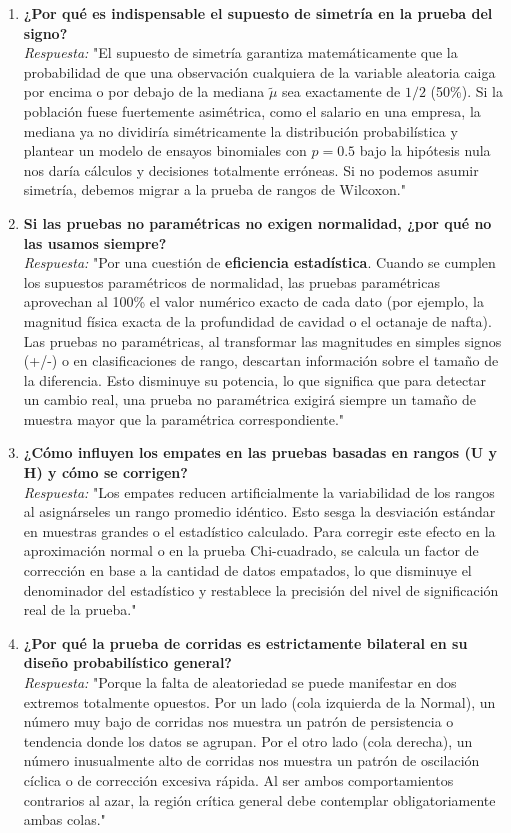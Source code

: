 \documentclass[11pt,a4paper]{article}
\begin{document}
\begin{enumerate}
    \item \textbf{¿Por qué es indispensable el supuesto de simetría en la prueba del signo?} \\
          \textit{Respuesta:} "El supuesto de simetría garantiza matemáticamente que la probabilidad de que una observación cualquiera de la variable aleatoria caiga por encima o por debajo de la mediana $\tilde{\mu}$ sea exactamente de $1/2$ (50\%). Si la población fuese fuertemente asimétrica, como el salario en una empresa, la mediana ya no dividiría simétricamente la distribución probabilística y plantear un modelo de ensayos binomiales con $p=0.5$ bajo la hipótesis nula nos daría cálculos y decisiones totalmente erróneas. Si no podemos asumir simetría, debemos migrar a la prueba de rangos de Wilcoxon."
    
    \item \textbf{Si las pruebas no paramétricas no exigen normalidad, ¿por qué no las usamos siempre?} \\
          \textit{Respuesta:} "Por una cuestión de \textbf{eficiencia estadística}. Cuando se cumplen los supuestos paramétricos de normalidad, las pruebas paramétricas aprovechan al 100\% el valor numérico exacto de cada dato (por ejemplo, la magnitud física exacta de la profundidad de cavidad o el octanaje de nafta). Las pruebas no paramétricas, al transformar las magnitudes en simples signos (+/-) o en clasificaciones de rango, descartan información sobre el tamaño de la diferencia. Esto disminuye su potencia, lo que significa que para detectar un cambio real, una prueba no paramétrica exigirá siempre un tamaño de muestra mayor que la paramétrica correspondiente."
          
    \item \textbf{¿Cómo influyen los empates en las pruebas basadas en rangos (U y H) y cómo se corrigen?} \\
          \textit{Respuesta:} "Los empates reducen artificialmente la variabilidad de los rangos al asignárseles un rango promedio idéntico. Esto sesga la desviación estándar en muestras grandes o el estadístico calculado. Para corregir este efecto en la aproximación normal o en la prueba Chi-cuadrado, se calcula un factor de corrección en base a la cantidad de datos empatados, lo que disminuye el denominador del estadístico y restablece la precisión del nivel de significación real de la prueba."

    \item \textbf{¿Por qué la prueba de corridas es estrictamente bilateral en su diseño probabilístico general?} \\
          \textit{Respuesta:} "Porque la falta de aleatoriedad se puede manifestar en dos extremos totalmente opuestos. Por un lado (cola izquierda de la Normal), un número muy bajo de corridas nos muestra un patrón de persistencia o tendencia donde los datos se agrupan. Por el otro lado (cola derecha), un número inusualmente alto de corridas nos muestra un patrón de oscilación cíclica o de corrección excesiva rápida. Al ser ambos comportamientos contrarios al azar, la región crítica general debe contemplar obligatoriamente ambas colas."
\end{enumerate}
\end{document}
